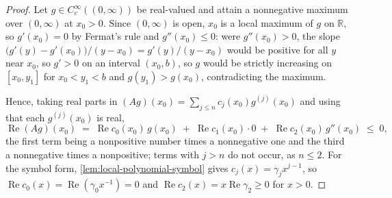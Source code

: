 \begin{proof}
\leanok
{}
Let $g \in C_c^\infty((0,\infty))$ be real-valued and attain a nonnegative maximum over
$(0,\infty)$ at $x_0 > 0$. Since $(0,\infty)$ is open, $x_0$ is a local maximum of $g$ on
$\mathbb{R}$, so $g'(x_0) = 0$ by Fermat's rule and $g''(x_0) \le 0$: were $g''(x_0) > 0$, the
slope $\bigl(g'(y) - g'(x_0)\bigr)/(y - x_0) = g'(y)/(y-x_0)$ would be positive for all $y$ near
$x_0$, so $g' > 0$ on an interval $(x_0, b)$, so $g$ would be strictly increasing on
$[x_0, y_1]$ for $x_0 < y_1 < b$ and $g(y_1) > g(x_0)$, contradicting the maximum.

Hence, taking real parts in $(Ag)(x_0) = \sum_{j \le n} c_j(x_0)g^{(j)}(x_0)$ and using that each
$g^{(j)}(x_0)$ is real,
\[
  \operatorname{Re}(Ag)(x_0)
    \;=\; \operatorname{Re}c_0(x_0)\,g(x_0)
        \;+\; \operatorname{Re}c_1(x_0)\cdot 0
        \;+\; \operatorname{Re}c_2(x_0)\,g''(x_0)
  \;\le\; 0,
\]
the first term being a nonpositive number times a nonnegative one and the third a nonnegative
times a nonpositive; terms with $j > n$ do not occur, as $n \le 2$. For the symbol form,
\ref{lem:local-polynomial-symbol} gives $c_j(x) = \gamma_j x^{j-1}$, so
$\operatorname{Re}c_0(x) = \operatorname{Re}(\gamma_0 x^{-1}) = 0$ and
$\operatorname{Re}c_2(x) = x\operatorname{Re}\gamma_2 \ge 0$ for $x > 0$.
\end{proof}


